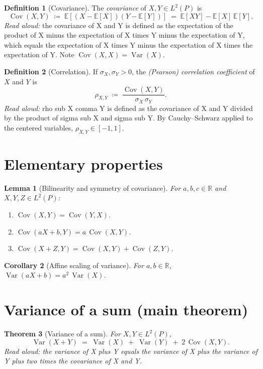 \documentclass[11pt]{article}
\newtheorem{theorem}{Theorem}
\newtheorem{lemma}[theorem]{Lemma}
\newtheorem{corollary}[theorem]{Corollary}
\theoremstyle{definition}
\newtheorem{definition}{Definition}
\theoremstyle{remark}
\DeclareMathOperator{\Var}{Var}
\DeclareMathOperator{\Cov}{Cov}
\newcommand{\E}{\mathbb{E}}
\newcommand{\R}{\mathbb{R}}
\begin{document}
\begin{definition}[Covariance]
The \emph{covariance} of $X, Y \in L^2(P)$ is
\[
\Cov(X, Y) \;\coloneqq\; \E\!\left[(X - \E[X])(Y - \E[Y])\right]
           \;=\; \E[XY] - \E[X]\,\E[Y].
\]
\emph{Read aloud:} the covariance of X and Y is defined as the expectation of the product of X minus the expectation of X times Y minus the expectation of Y, which equals the expectation of X times Y minus the expectation of X times the expectation of Y.
Note $\Cov(X, X) = \Var(X)$.
\end{definition}

\begin{definition}[Correlation]
If $\sigma_X, \sigma_Y > 0$, the \emph{(Pearson) correlation coefficient} of $X$ and $Y$ is
\[
\rho_{X, Y} \;\coloneqq\; \frac{\Cov(X, Y)}{\sigma_X \, \sigma_Y}.
\]
\emph{Read aloud:} rho sub X comma Y is defined as the covariance of X and Y divided by the product of sigma sub X and sigma sub Y.
By Cauchy--Schwarz applied to the centered variables, $\rho_{X, Y} \in [-1, 1]$.
\end{definition}

\section{Elementary properties}

\begin{lemma}[Bilinearity and symmetry of covariance]
For $a, b, c \in \R$ and $X, Y, Z \in L^2(P)$:
\begin{enumerate}
\item $\Cov(X, Y) = \Cov(Y, X)$.
\item $\Cov(aX + b, Y) = a\,\Cov(X, Y)$.
\item $\Cov(X + Z, Y) = \Cov(X, Y) + \Cov(Z, Y)$.
\end{enumerate}
\end{lemma}

\begin{corollary}[Affine scaling of variance]
For $a, b \in \R$, $\Var(aX + b) = a^2 \, \Var(X)$.
\end{corollary}

\section{Variance of a sum (main theorem)}

\begin{theorem}[Variance of a sum]
\label{thm:var-sum}
For $X, Y \in L^2(P)$,
\[
\Var(X + Y) \;=\; \Var(X) \;+\; \Var(Y) \;+\; 2\,\Cov(X, Y).
\]
\emph{Read aloud:} the variance of X plus Y equals the variance of X plus the variance of Y plus two times the covariance of X and Y.
\end{theorem}
\end{document}
